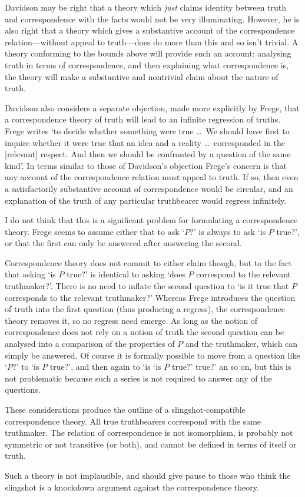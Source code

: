 Davidson may be right that a theory which \emph{just} claims identity between truth and correspondence with the facts would not be very illuminating.
However, he is also right that a theory which gives a substantive account of the correspondence relation---without appeal to truth---does do more than this and so isn't trivial.
A theory conforming to the bounds above will provide such an account: analysing truth in terms of correspondence, and then explaining what correspondence is, the theory will make a substantive and nontrivial claim about the nature of truth.

Davidson also considers a separate objection, made more explicitly by Frege, that a correspondence theory of truth will lead to an infinite regression of truths.
Frege writes `to decide whether something were true \ldots\ We should have first to inquire whether it were true that an idea and a reality \ldots\ corresponded in the [relevant] respect. And then we should be confronted by a question of the same kind'.
\parencite[291]{ITheThoughtFrege1956} 
In terms similar to those of Davidson's objection Frege's concern is that any account of the correspondence relation must appeal to truth.
If so, then even a satisfactorily substantive account of correspondence would be circular, and an explanation of the truth of any particular truthbearer would regress infinitely.

I do not think that this is a significant problem for formulating a correspondence theory.
Frege seems to assume either that to ask `$P$?' is always to ask `is $P$ true?', or that the first can only be answered after answering the second.

Correspondence theory does not commit to either claim though, but to the fact that asking `is $P$ true?' is identical to asking `does $P$ correspond to the relevant truthmaker?'.
There is no need to inflate the second question to `is it true that $P$ corresponds to the relevant truthmaker?'
Whereas Frege introduces the question of truth into the first question (thus producing a regress), the correspondence theory removes it, so no regress need emerge.
As long as the notion of correspondence does not rely on a notion of truth the second question can be analysed into a comparison of the properties of $P$ and the truthmaker, which can simply be answered.
Of course it is formally possible to move from a question like `$P$?' to `is $P$ true?', and then again to `is `is $P$ true?' true?' an so on, but this is not problematic because such a series is not required to answer any of the questions.

These considerations produce the outline of a slingshot-compatible correspondence theory.
All true truthbearers correspond with the same truthmaker.
The relation of correspondence is not isomorphism, is probably not symmetric or not transitive (or both), and cannot be defined in terms of itself or truth.

Such a theory is not implausible, and should give pause to those who think the slingshot is a knockdown argument against the correspondence theory.
